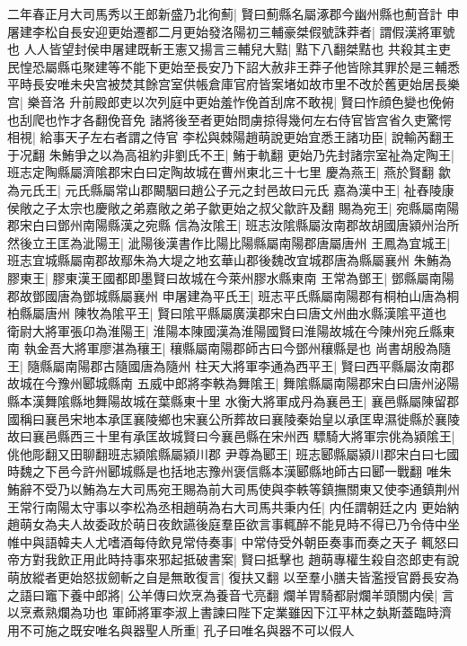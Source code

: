 二年春正月大司馬秀以王郎新盛乃北徇薊|{
	賢曰薊縣名屬涿郡今幽州縣也薊音計}
申屠建李松自長安迎更始遷都二月更始發洛陽初三輔豪桀假號誅莽者|{
	謂假漢將軍號也}
人人皆望封侯申屠建既斬王憲又揚言三輔兒大黠|{
	黠下八翻桀黠也}
共殺其主吏民惶恐屬縣屯聚建等不能下更始至長安乃下詔大赦非王莽子他皆除其罪於是三輔悉平時長安唯未央宫被焚其餘宫室供帳倉庫官府皆案堵如故市里不改於舊更始居長樂宫|{
	樂音洛}
升前殿郎吏以次列庭中更始羞怍俛首刮席不敢視|{
	賢曰怍顔色變也俛俯也刮爬也怍才各翻俛音免}
諸將後至者更始問虜掠得幾何左右侍官皆宫省久吏驚愕相視|{
	給事天子左右者謂之侍官}
李松與棘陽趙萌說更始宜悉王諸功臣|{
	說輸芮翻王于况翻}
朱鮪爭之以為高祖約非劉氏不王|{
	鮪于軌翻}
更始乃先封諸宗室祉為定陶王|{
	班志定陶縣屬濟隂郡宋白曰定陶故城在曹州東北三十七里}
慶為燕王|{
	燕於賢翻}
歙為元氏王|{
	元氏縣屬常山郡闞駰曰趙公子元之封邑故曰元氏}
嘉為漢中王|{
	祉舂陵康侯敞之子太宗也慶敞之弟嘉敞之弟子歙更始之叔父歙許及翻}
賜為宛王|{
	宛縣屬南陽郡宋白曰鄧州南陽縣漢之宛縣}
信為汝隂王|{
	班志汝隂縣屬汝南郡故胡國唐潁州治所}
然後立王匡為泚陽王|{
	泚陽後漢書作比陽比陽縣屬南陽郡唐屬唐州}
王鳳為宜城王|{
	班志宜城縣屬南郡故鄢朱為大堤之地玄華山郡後魏改宜城郡唐為縣屬襄州}
朱鮪為膠東王|{
	膠東漢王國都即墨賢曰故城在今萊州膠水縣東南}
王常為鄧王|{
	鄧縣屬南陽郡故鄧國唐為鄧城縣屬襄州}
申屠建為平氏王|{
	班志平氏縣屬南陽郡有桐柏山唐為桐柏縣屬唐州}
陳牧為隂平王|{
	賢曰隂平縣屬廣漢郡宋白曰唐文州曲水縣漢隂平道也}
衛尉大將軍張卬為淮陽王|{
	淮陽本陳國漢為淮陽國賢曰淮陽故城在今陳州宛丘縣東南}
執金吾大將軍廖湛為穰王|{
	穰縣屬南陽郡師古曰今鄧州穰縣是也}
尚書胡殷為隨王|{
	隨縣屬南陽郡古隨國唐為隨州}
柱天大將軍李通為西平王|{
	賢曰西平縣屬汝南郡故城在今豫州郾城縣南}
五威中郎將李軼為舞隂王|{
	舞隂縣屬南陽郡宋白曰唐州泌陽縣本漢舞隂縣地舞陽故城在葉縣東十里}
水衡大將軍成丹為襄邑王|{
	襄邑縣屬陳留郡國稱曰襄邑宋地本承匡襄陵鄉也宋襄公所葬故曰襄陵秦始皇以承匡卑濕徙縣於襄陵故曰襄邑縣西三十里有承匡故城賢曰今襄邑縣在宋州西}
驃騎大將軍宗佻為潁隂王|{
	佻他彫翻又田聊翻班志潁隂縣屬潁川郡}
尹尊為郾王|{
	班志郾縣屬潁川郡宋白曰七國時魏之下邑今許州郾城縣是也括地志豫州褒信縣本漢郾縣地師古曰郾一戰翻}
唯朱鮪辭不受乃以鮪為左大司馬宛王賜為前大司馬使與李軼等鎮撫關東又使李通鎮荆州王常行南陽太守事以李松為丞相趙萌為右大司馬共秉内任|{
	内任謂朝廷之内}
更始納趙萌女為夫人故委政於萌日夜飲讌後庭羣臣欲言事輒醉不能見時不得已乃令侍中坐帷中與語韓夫人尤嗜酒每侍飲見常侍奏事|{
	中常侍受外朝臣奏事而奏之天子}
輒怒曰帝方對我飲正用此時持事來邪起抵破書案|{
	賢曰抵擊也}
趙萌專權生殺自恣郎吏有說萌放縱者更始怒拔劒斬之自是無敢復言|{
	復扶又翻}
以至羣小膳夫皆濫授官爵長安為之語曰竈下養中郎將|{
	公羊傳曰炊烹為養音弋亮翻}
爛羊胃騎都尉爛羊頭關内侯|{
	言以烹煮熟爛為功也}
軍師將軍李淑上書諫曰陛下定業雖因下江平林之埶斯蓋臨時濟用不可施之既安唯名與器聖人所重|{
	孔子曰唯名與器不可以假人}
